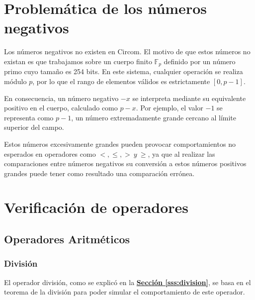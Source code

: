 \documentclass[a4paper,12pt]{report}
\begin{document}
	 
	
	
	
	\cleardoublepage
	\appendix 
	
	\makeatletter
	\def\chaptername{Apéndice}
	\def\@chapapp{Apéndice} 
	\makeatother
	
	\chapter{Problemática de los números negativos}
	\label{ap:num_negativos}
	
	\vspace{0.2cm}
	\noindent Los números negativos no existen en Circom. El motivo de que estos números no existan es que trabajamos sobre un cuerpo finito $\mathbb{F}_p$ definido por un número primo cuyo tamaño es 254 bits. En este sistema, cualquier operación se realiza módulo $p$, por lo que el rango de elementos válidos es estrictamente $[0, p-1]$. 
	
	\vspace{0.2cm}
	\noindent En consecuencia, un número negativo $-x$ se interpreta mediante su equivalente positivo en el cuerpo, calculado como $p - x$. Por ejemplo, el valor $-1$ se representa como $p-1$, un número extremadamente grande cercano al límite superior del campo. 
	
	\vspace{0.2cm}
	\noindent Estos números excesivamente grandes pueden provocar comportamientos no esperados en operadores como $<, \leq, > \ y \ \geq$, ya que al realizar las comparaciones entre números negativos su conversión a estos números positivos grandes puede tener como resultado una comparación errónea.
	
	\chapter{Verificación de operadores}
	\section{Operadores Aritméticos}
	\subsection{División}
	\label{sec:ver-division}
	
	\vspace{0.2cm}
	\noindent El operador división, como se explicó en la \hyperref[sss:division]{\textbf{Sección \ref{sss:division}}}, se basa en el teorema de la división para poder simular el comportamiento de este operador. 
	
\end{document}
